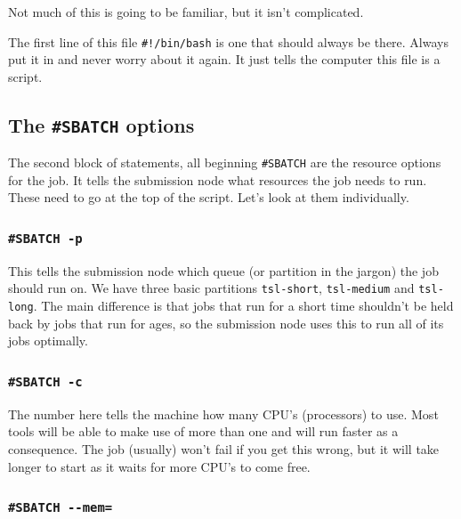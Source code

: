 \documentclass[]{book}
\begin{document}
Not much of this is going to be familiar, but it isn't complicated.

The first line of this file \texttt{\#!/bin/bash} is one that should always be there. Always put it in and never worry about it again. It just tells the computer this file is a script.

\hypertarget{the-sbatch-options}{%
\subsection{\texorpdfstring{The \texttt{\#SBATCH} options}{The \#SBATCH options}}\label{the-sbatch-options}}

The second block of statements, all beginning \texttt{\#SBATCH} are the resource options for the job. It tells the submission node what resources the job needs to run. These need to go at the top of the script. Let's look at them individually.

\hypertarget{sbatch--p}{%
\subsubsection{\texorpdfstring{\texttt{\#SBATCH\ -p}}{\#SBATCH -p}}\label{sbatch--p}}

This tells the submission node which queue (or partition in the jargon) the job should run on. We have three basic partitions \texttt{tsl-short}, \texttt{tsl-medium} and \texttt{tsl-long}. The main difference is that jobs that run for a short time shouldn't be held back by jobs that run for ages, so the submission node uses this to run all of its jobs optimally.

\hypertarget{sbatch--c}{%
\subsubsection{\texorpdfstring{\texttt{\#SBATCH\ -c}}{\#SBATCH -c}}\label{sbatch--c}}

The number here tells the machine how many CPU's (processors) to use. Most tools will be able to make use of more than one and will run faster as a consequence. The job (usually) won't fail if you get this wrong, but it will take longer to start as it waits for more CPU's to come free.

\hypertarget{sbatch---mem}{%
\subsubsection{\texorpdfstring{\texttt{\#SBATCH\ -\/-mem=}}{\#SBATCH -\/-mem=}}\label{sbatch---mem}}
\end{document}
